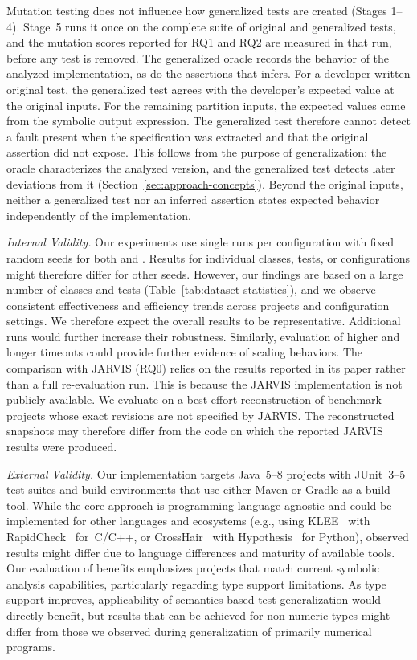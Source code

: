 Mutation testing does not influence how generalized tests are created (Stages 1--4).
Stage~5 runs it once on the complete suite of original and generalized tests,
and the mutation scores reported for RQ1 and RQ2 are measured in that run,
before any test is removed.
The generalized oracle records the behavior of the analyzed implementation,
as do the assertions that \ToolEvoSuite{} infers.
For a developer-written original test,
the generalized test agrees with the developer's expected value at the original inputs.
For the remaining partition inputs,
the expected values come from the symbolic output expression.
The generalized test therefore cannot detect a fault
present when the specification was extracted
and that the original assertion did not expose.
This follows from the purpose of generalization:
the oracle characterizes the analyzed version,
and the generalized test detects later deviations from it (Section~\ref{sec:approach-concepts}).
Beyond the original inputs,
neither a generalized test nor an inferred assertion
states expected behavior independently of the implementation.

\textit{Internal Validity.}
Our experiments use single runs per configuration
with fixed random seeds for both \ToolEvoSuite{} and \ToolJqwik{}.
Results for individual classes, tests, or configurations might therefore differ for other seeds.
However, our findings are based on a large number of classes and tests
(Table~\ref{tab:dataset-statistics}),
and we observe consistent effectiveness and efficiency trends across projects
and configuration settings.
We therefore expect the overall results to be representative.
Additional runs would further increase their robustness.
Similarly, evaluation of higher \tries{}
and longer timeouts could provide further evidence of scaling behaviors.
%
The comparison with JARVIS (RQ0) relies on the results reported
in its paper rather than a full re-evaluation run.
This is because the JARVIS implementation is not publicly available.
We evaluate \ToolTeralizer{} on a best-effort reconstruction
of benchmark projects whose exact revisions are not specified by JARVIS\@.
The reconstructed snapshots may therefore differ
from the code on which the reported JARVIS results were produced.

\textit{External Validity.}
Our implementation targets Java~5--8 projects with JUnit~3--5 test suites
and build environments that use either Maven or Gradle as a build tool.
While the core approach is programming language-agnostic and could be
implemented for other languages and ecosystems
(e.g., using KLEE~\cite{cadar_2008_klee}
with RapidCheck~\cite{rapidcheck_2025} for~C/C++,
or CrossHair~\cite{crosshair_2025}
with Hypothesis~\cite{maciver_2019_hypothesis} for Python),
observed results might differ
due to language differences
and maturity of available tools.
%
Our evaluation of benefits
emphasizes projects that match current
symbolic analysis capabilities,
particularly regarding type support limitations.
As type support improves,
applicability of semantics-based test generalization
would directly benefit,
but results that can be achieved for non-numeric types might
differ from those we observed during generalization
of primarily numerical programs.
